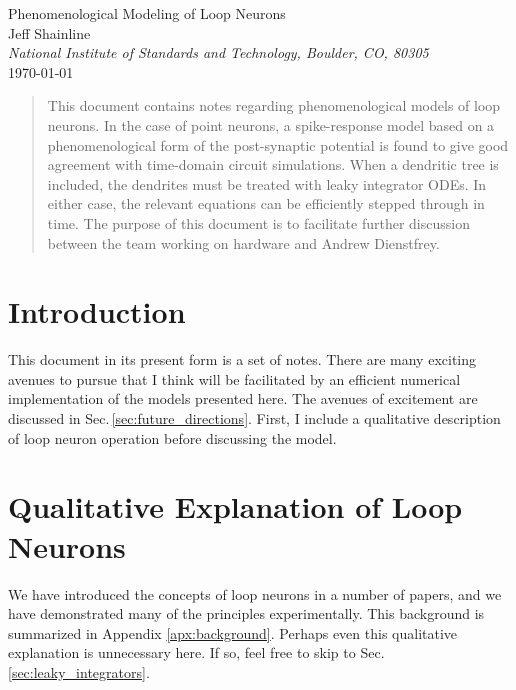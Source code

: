 \documentclass[]{article}
\begin{document}
    
\begin{center}
\LARGE{Phenomenological Modeling of Loop Neurons}\\ 
\vspace{0.3em}
\large Jeff Shainline \\
\textit{\small National Institute of Standards and Technology, Boulder, CO, 80305}\\
\vspace{0.3em}
\small \today

\begin{abstract}
This document contains notes regarding phenomenological models of loop neurons. In the case of point neurons, a spike-response model based on a phenomenological form of the post-synaptic potential is found to give good agreement with time-domain circuit simulations. When a dendritic tree is included, the dendrites must be treated with leaky integrator ODEs. In either case, the relevant equations can be efficiently stepped through in time. The purpose of this document is to facilitate further discussion between the team working on hardware and Andrew Dienstfrey.
\vspace{1em}
\end{abstract}

\end{center}



\section{\label{sec:introduction}Introduction}
This document in its present form is a set of notes. There are many exciting avenues to pursue that I think will be facilitated by an efficient numerical implementation of the models presented here. The avenues of excitement are discussed in Sec.\,\ref{sec:future_directions}. First, I include a qualitative description of loop neuron operation before discussing the model.

\section{\label{sec:qualitative_explanation_of_loop_neurons}Qualitative Explanation of Loop Neurons}
We have introduced the concepts of loop neurons in a number of papers, and we have demonstrated many of the principles experimentally. This background is summarized in Appendix \ref{apx:background}. Perhaps even this qualitative explanation is unnecessary here. If so, feel free to skip to Sec.\,\ref{sec:leaky_integrators}.
\end{document}
